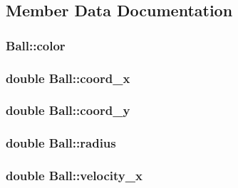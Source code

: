\subsection{Member Data Documentation}
\hypertarget{classBall_aaf859de645927ea78ef1defae263ba09}{
\subsubsection[{color}]{ Ball\+::color\hspace{0.3cm}{\ttfamily [private]}}}\label{classBall_aaf859de645927ea78ef1defae263ba09}
\hypertarget{classBall_a6d5a7aacffad1248080398f2d6540fe0}{
\subsubsection[{coord\+\_\+x}]{\setlength{\rightskip}{0pt plus 5cm}double Ball\+::coord\+\_\+x\hspace{0.3cm}{\ttfamily [private]}}}\label{classBall_a6d5a7aacffad1248080398f2d6540fe0}
\hypertarget{classBall_ad65b08abc2b3d8ab7e51f0dc41b6ea08}{
\subsubsection[{coord\+\_\+y}]{\setlength{\rightskip}{0pt plus 5cm}double Ball\+::coord\+\_\+y\hspace{0.3cm}{\ttfamily [private]}}}\label{classBall_ad65b08abc2b3d8ab7e51f0dc41b6ea08}
\hypertarget{classBall_ae75638f44296592c288bf7c87590fee0}{
\subsubsection[{radius}]{\setlength{\rightskip}{0pt plus 5cm}double Ball\+::radius\hspace{0.3cm}{\ttfamily [private]}}}\label{classBall_ae75638f44296592c288bf7c87590fee0}
\hypertarget{classBall_a6b84a62eb0d13d592472f9419151c25b}{
\subsubsection[{velocity\+\_\+x}]{\setlength{\rightskip}{0pt plus 5cm}double Ball\+::velocity\+\_\+x\hspace{0.3cm}{\ttfamily [private]}}}\label{classBall_a6b84a62eb0d13d592472f9419151c25b}
